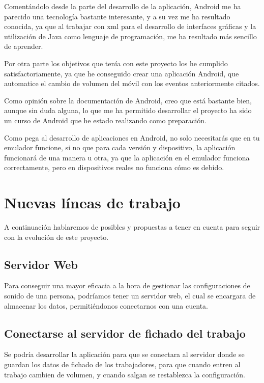 
Comentándolo desde la parte del desarrollo de la aplicación, Android me ha parecido una tecnología bastante interesante, y a su vez me ha resultado conocida, ya que al trabajar con xml para el desarrollo de interfaces gráficas y la utilización de Java como lenguaje de programación, me ha resultado más sencillo de aprender.

Por otra parte los objetivos que tenía con este proyecto los he cumplido satisfactoriamente, ya que he conseguido crear una aplicación Android, que automatice el cambio de volumen del móvil con los eventos anteriormente citados.

Como opinión sobre la documentación de Android, creo que está bastante bien, aunque sin duda alguna, lo que me ha permitido desarrollar el proyecto ha sido un curso de Android que he estado realizando como preparación.

Como pega al desarrollo de aplicaciones en Android, no solo necesitarás que en tu emulador funcione, si no que para cada versión y dispositivo, la aplicación funcionará de una manera u otra, ya que la aplicación en el emulador funciona correctamente, pero en dispositivos reales no funciona cómo es debido.

\section{Nuevas líneas de trabajo}

A continuación hablaremos de posibles y propuestas a tener en cuenta para seguir con la evolución de este proyecto.

\subsection{Servidor Web}
Para conseguir una mayor eficacia a la hora de gestionar las configuraciones de sonido de una persona, podríamos tener un servidor web, el cual se encargara de almacenar los datos, permitiéndonos conectarnos con una cuenta.

\subsection{Conectarse al servidor de fichado del trabajo}

Se podría desarrollar la aplicación para que se conectara al servidor donde se guardan los datos de fichado de los trabajadores, para que cuando entren al trabajo cambien de volumen, y cuando salgan se restablezca la configuración.


